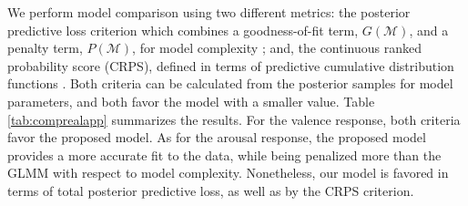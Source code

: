 We perform model comparison using two different metrics: the posterior predictive loss 
criterion which combines a goodness-of-fit term, $G(\mathcal{M})$, and a penalty term, 
$P(\mathcal{M})$, for model complexity \citep{GelfandGhosh1998}; and, the continuous 
ranked probability score (CRPS), defined in terms of predictive cumulative distribution 
functions \citep{Gneiting2007}. Both criteria can be calculated from the posterior samples 
for model parameters, and both favor the model with a smaller value.        
Table \ref{tab:comprealapp} summarizes the results. For the 
valence response, both criteria favor the proposed model. As for the arousal response, 
the proposed model provides a more accurate fit to the data, while being penalized more 
than the GLMM with respect to model complexity. Nonetheless, our model is favored in terms 
of total posterior predictive loss, as well as by the CRPS criterion.









